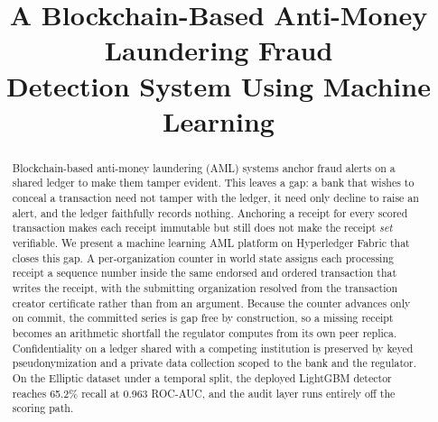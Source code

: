 \documentclass[conference]{IEEEtran}
\begin{document}
\title{A Blockchain-Based Anti-Money Laundering Fraud\\
Detection System Using Machine Learning}

\author{
\and
{}
}

\maketitle

\begin{abstract}
Blockchain-based anti-money laundering (AML) systems anchor fraud alerts on a
shared ledger to make them tamper evident. This leaves a gap: a bank that wishes
to conceal a transaction need not tamper with the ledger, it need only decline
to raise an alert, and the ledger faithfully records nothing. Anchoring a
receipt for every scored transaction makes each receipt immutable but still does
not make the receipt \emph{set} verifiable. We present a machine learning AML
platform on Hyperledger Fabric that closes this gap. A per-organization counter
in world state assigns each processing receipt a sequence number inside the same
endorsed and ordered transaction that writes the receipt, with the submitting
organization resolved from the transaction creator certificate rather than from
an argument. Because the counter advances only on commit, the committed series
is gap free by construction, so a missing receipt becomes an arithmetic
shortfall the regulator computes from its own peer replica. Confidentiality on a
ledger shared with a competing institution is preserved by keyed pseudonymization
and a private data collection scoped to the bank and the regulator. On the
Elliptic dataset under a temporal split, the deployed LightGBM detector reaches
65.2\% recall at 0.963 ROC-AUC, and the audit layer runs entirely off the
scoring path.
\end{abstract}
\end{document}
